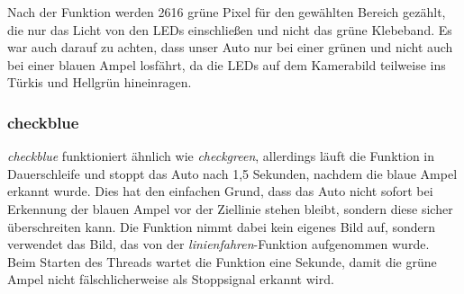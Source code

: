 \documentclass[a4paper, 12pt]{scrartcl}
\begin{document}
Nach der Funktion werden 2616 grüne Pixel für den gewählten Bereich gezählt, die nur das Licht von den LEDs einschließen und nicht das grüne Klebeband. Es war auch darauf zu achten, dass unser Auto nur bei einer grünen und nicht auch bei einer blauen Ampel losfährt, da die LEDs auf dem Kamerabild teilweise ins Türkis und Hellgrün hineinragen.

\subsubsection{checkblue}


\textit{checkblue} funktioniert ähnlich wie \textit{checkgreen}, allerdings läuft die Funktion in Dauerschleife und stoppt das Auto nach 1,5 Sekunden, nachdem die blaue Ampel erkannt wurde. Dies hat den einfachen Grund, dass das Auto nicht sofort bei Erkennung der blauen Ampel vor der Ziellinie stehen bleibt, sondern diese sicher überschreiten kann. Die Funktion nimmt dabei kein eigenes Bild auf, sondern verwendet das Bild, das von der \textit{linienfahren}-Funktion aufgenommen wurde. Beim Starten des Threads wartet die Funktion eine Sekunde, damit die grüne Ampel nicht fälschlicherweise als Stoppsignal erkannt wird.
\end{document}
